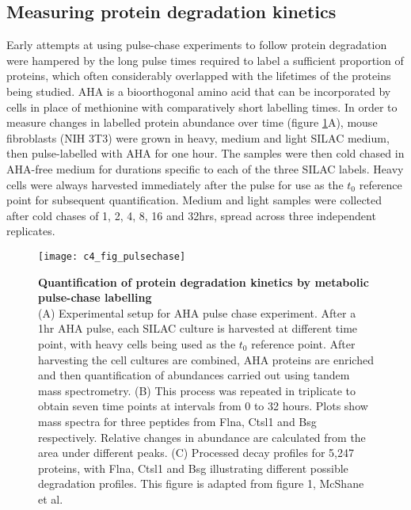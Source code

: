 \documentclass[a4paper,11pt,twoside,openright]{scrbook}
\begin{document}
\subsection{Measuring protein degradation kinetics}
Early attempts at using pulse-chase experiments to follow protein degradation were hampered by the long pulse times required to label a sufficient proportion of proteins, which often considerably overlapped with the lifetimes of the proteins being studied. AHA is a bioorthogonal amino acid that can be incorporated by cells in place of methionine with comparatively short labelling times. In order to measure changes in labelled protein abundance over time (figure \ref{figure:pulsechase}A), mouse fibroblasts (NIH 3T3) were grown in heavy, medium and light SILAC medium, then pulse-labelled with AHA for one hour. The samples were then cold chased in AHA-free medium for durations specific to each of the three SILAC labels. Heavy cells were always harvested immediately after the pulse for use as the $t_{0}$ reference point for subsequent quantification. Medium and light samples were collected after cold chases of 1, 2, 4, 8, 16 and 32hrs, spread across three independent replicates.

\begin{figure}
    \texttt{[image: c4\_fig\_pulsechase]}
    \caption[Quantification of protein degradation kinetics by metabolic pulse-chase labelling]{\sffamily \textbf{Quantification of protein degradation kinetics by metabolic pulse-chase labelling} \\ \small (A) Experimental setup for AHA pulse chase experiment. After a 1hr AHA pulse, each SILAC culture is harvested at different time point, with heavy cells being used as the $t_{0}$ reference point. After harvesting the cell cultures are combined, AHA proteins are enriched and then quantification of abundances carried out using tandem mass spectrometry. (B) This process was repeated in triplicate to obtain seven time points at intervals from 0 to 32 hours. Plots show mass spectra for three peptides from Flna, Ctsl1 and Bsg respectively. Relative changes in abundance are calculated from the area under different peaks. (C) Processed decay profiles for 5,247 proteins, with Flna, Ctsl1 and Bsg illustrating different possible degradation profiles. This figure is adapted from figure 1, McShane et al.\cite{McShane2016}}
    \label{figure:pulsechase}
\end{figure}
\end{document}
